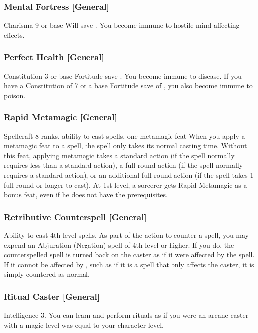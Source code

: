 \subsubsection{Mental Fortress [General]}
\featpre Charisma 9 or base Will save .
\featben You become immune to hostile mind-affecting effects.

\subsubsection{Perfect Health [General]}
\featpre Constitution 3 or base Fortitude save .
\featben You become immune to disease. If you have a Constitution of 7 or a base Fortitude save of , you also become immune to poison.

\subsubsection{Rapid Metamagic [General]}
 Spellcraft 8 ranks, ability to cast spells, one metamagic feat
 When you apply a metamagic feat to a spell, the spell only takes its normal casting time.
 Without this feat, applying metamagic takes a standard action (if the spell normally requires less than a standard action), a full-round action (if the spell normally requires a standard action), or an additional full-round action (if the spell takes 1 full round or longer to cast).
 At 1st level, a sorcerer gets Rapid Metamagic as a bonus feat, even if he does not have the prerequisites.

\subsubsection{Retributive Counterspell [General]}
 Ability to cast 4th level spells.
 As part of the action to counter a spell, you may expend an Abjuration (Negation) spell of 4th level or higher. If you do, the counterspelled spell is turned back on the caster as if it were affected by the  spell. If it cannot be affected by , such as if it is a spell that only affects the caster, it is simply countered as normal.

\subsubsection{Ritual Caster [General]}
\featpre Intelligence 3.
\featben You can learn and perform rituals as if you were an arcane caster with a magic level was equal to your character level.


